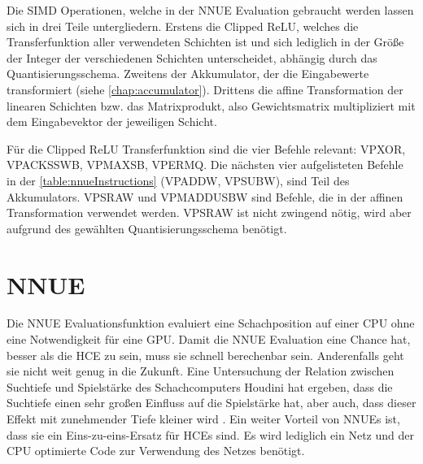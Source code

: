 Die \ac{SIMD} Operationen, welche in der \ac{NNUE} Evaluation gebraucht werden lassen sich in drei Teile untergliedern. Erstens die Clipped \ac{ReLU}, welches die Transferfunktion aller verwendeten Schichten ist und sich lediglich in der Größe der Integer der verschiedenen Schichten unterscheidet, abhängig durch das Quantisierungsschema. Zweitens der Akkumulator, der die Eingabewerte transformiert (siehe \autoref{chap:accumulator}). Drittens die affine Transformation der linearen Schichten bzw. das Matrixprodukt, also Gewichtsmatrix multipliziert mit dem Eingabevektor der jeweiligen Schicht.

Für die Clipped \ac{ReLU} Transferfunktion sind die vier Befehle relevant: VPXOR, VPACKSSWB, VPMAXSB, VPERMQ. Die nächsten vier aufgelisteten Befehle in der \autoref{table:nnueInstructions} (VPADDW, VPSUBW), sind Teil des Akkumulators. VPSRAW und VPMADDUSBW sind Befehle, die in der affinen Transformation verwendet werden. VPSRAW ist nicht zwingend nötig, wird aber aufgrund des gewählten Quantisierungsschema benötigt. 



\section{NNUE}

Die \ac{NNUE} Evaluationsfunktion evaluiert eine Schachposition auf einer CPU ohne eine Notwendigkeit für eine GPU. Damit die \ac{NNUE} Evaluation eine Chance hat, besser als die \ac{HCE} zu sein, muss sie schnell berechenbar sein. Anderenfalls geht sie nicht weit genug in die Zukunft. Eine Untersuchung der Relation zwischen Suchtiefe und Spielstärke des Schachcomputers Houdini \citeyear{Ferreira2013} hat ergeben, dass die Suchtiefe einen sehr großen Einfluss auf die Spielstärke hat, aber auch, dass dieser Effekt mit zunehmender Tiefe kleiner wird \cite{Ferreira2013}. Ein weiter Vorteil von \acp{NNUE} ist, dass sie ein Eins-zu-eins-Ersatz für \acp{HCE} sind. Es wird lediglich ein Netz und der CPU optimierte Code zur Verwendung des Netzes benötigt.


